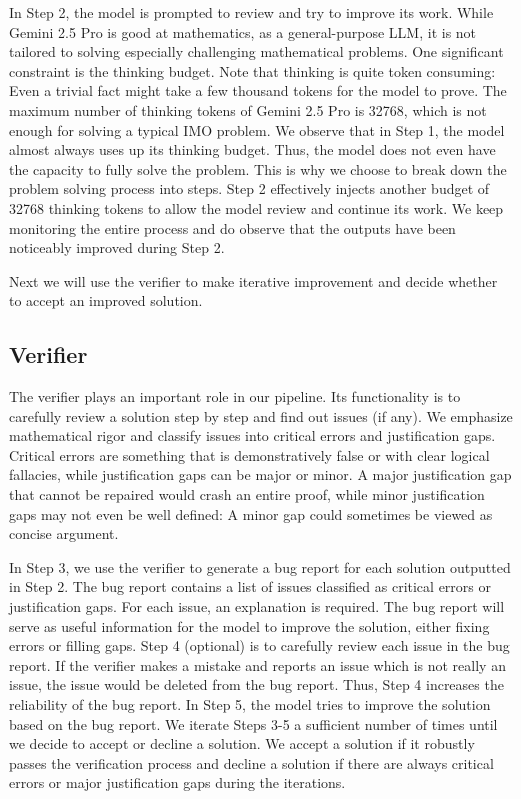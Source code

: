 In Step 2, the model is prompted to review and try to improve its work. While Gemini 2.5 Pro is good at mathematics, as a general-purpose LLM, it is not tailored to solving especially challenging mathematical problems. One significant constraint is the thinking budget. Note that thinking is quite token consuming: Even a trivial fact might take a few thousand tokens for the model to prove. The maximum number of thinking tokens of Gemini 2.5 Pro is 32768, which is not enough for solving a typical IMO problem. We observe that in Step 1, the model almost always uses up its thinking budget. Thus, the model does not even have the capacity to fully solve the problem. This is why we choose to break down the problem solving process into steps. Step 2 effectively injects another budget of 32768 thinking tokens to allow the model review and continue its work. We keep monitoring the entire process and do observe that the outputs have been noticeably improved during Step 2.

Next we will use the verifier to make iterative improvement and decide whether to accept an improved solution.

\subsection{Verifier}

The verifier plays an important role in our pipeline. Its functionality is to carefully review a solution step by step and find out issues (if any). We emphasize mathematical rigor and classify issues into critical errors and justification gaps. Critical errors are something that is demonstratively false or with clear logical fallacies, while justification gaps can be major or minor. A major justification gap that cannot be repaired would crash an entire proof, while minor justification gaps may not even be well defined: A minor gap could sometimes be viewed as concise argument.

In Step 3, we use the verifier to generate a bug report for each solution outputted in Step 2. The bug report contains a list of issues classified as critical errors or justification gaps. For each issue, an explanation is required. The bug report will serve as useful information for the model to improve the solution, either fixing errors or filling gaps. Step 4 (optional) is to carefully review each issue in the bug report. If the verifier makes a mistake and reports an issue which is not really an issue, the issue would be deleted from the bug report. Thus, Step 4 increases the reliability of the bug report. In Step 5, the model tries to improve the solution based on the bug report. We iterate Steps 3-5 a sufficient number of times until we decide to accept or decline a solution. We accept a solution if it robustly passes the verification process and decline a solution if there are always critical errors or major justification gaps during the iterations.

